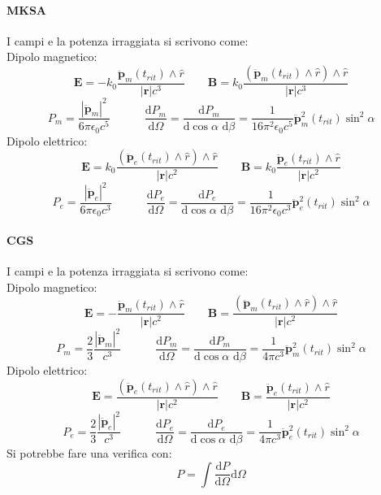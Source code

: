 \paragraph*{MKSA} I campi e la potenza irraggiata si scrivono come:\\
Dipolo magnetico:
\[
	\boldsymbol{E} = -k_{0}\frac{\ddot{\boldsymbol{p}}_m\left( t_{rit} \right) \wedge \hat{r} }{\left| \boldsymbol{r} \right| c^3} \quad \quad 
	\boldsymbol{B} = k_{0}\frac{\left( \ddot{\boldsymbol{p}}_{m}\left( t_{rit} \right) \wedge \hat{r}  \right) \wedge \hat{r}  }{ \left| \boldsymbol{r}  \right| c^3 }
\] 
\[
	P_m = \frac{\left| \ddot{\boldsymbol{p} }_{m} \right|^2}{6 \pi \epsilon_0 c^5} \quad  \quad \quad 
	\frac{\mbox{d} P_{m} }{\mbox{d} \Omega} = \frac{\mbox{d} P_m}{\mbox{d} \cos{\alpha \mbox{ d}\beta}} = \frac{1}{16 \pi ^2 \epsilon_0 c^5} \ddot{\boldsymbol{p}}_m^2( t_{rit})  \sin^2{\alpha} 
\] 
Dipolo elettrico:
\[	
	\boldsymbol{E} = k_{0}\frac{\left( \ddot{\boldsymbol{p}}_{e}\left( t_{rit} \right) \wedge \hat{r}  \right) \wedge \hat{r}  }{ \left| \boldsymbol{r}  \right| c^2 } \quad \quad 
	\boldsymbol{B} = k_{0}\frac{\ddot{\boldsymbol{p}}_e\left( t_{rit} \right) \wedge \hat{r} }{\left| \boldsymbol{r} \right| c^2} 
\] 
\[
	P_e = \frac{\left| \ddot{\boldsymbol{p} }_{e} \right|^2}{6 \pi \epsilon_0 c^3} \quad  \quad \quad 
	\frac{\mbox{d} P_{e}}{\mbox{d} \Omega} = \frac{\mbox{d} P_e}{\mbox{d} \cos{\alpha \mbox{ d}\beta}} = \frac{1}{16 \pi ^2 \epsilon_0 c^3} \ddot{\boldsymbol{p}}_e^2( t_{rit})  \sin^2{\alpha} 
\] 
\paragraph*{CGS} I campi e la potenza irraggiata si scrivono come:\\
Dipolo magnetico:
\[
	\boldsymbol{E} = -\frac{\ddot{\boldsymbol{p}}_m\left( t_{rit} \right) \wedge \hat{r} }{\left| \boldsymbol{r} \right| c^2} \quad \quad 
	\boldsymbol{B} = \frac{\left( \ddot{\boldsymbol{p}}_{m}\left( t_{rit} \right) \wedge \hat{r}  \right) \wedge \hat{r}  }{ \left| \boldsymbol{r}  \right| c^2 }
\] 
\[
	P_m = \frac{2}{3}\frac{\left| \ddot{\boldsymbol{p} }_{m} \right|^2}{c^3} \quad \quad \quad 
	\frac{\mbox{d} P_{m} }{\mbox{d} \Omega} = \frac{\mbox{d} P _m}{\mbox{d} \cos{\alpha \mbox{ d}\beta}} = \frac{1}{4 \pi c^3} \ddot{\boldsymbol{p}}_m^2( t_{rit})  \sin^2{\alpha} 
\] 
Dipolo elettrico:
\[	
	\boldsymbol{E} = \frac{\left( \ddot{\boldsymbol{p}}_{e}\left( t_{rit} \right) \wedge \hat{r}  \right) \wedge \hat{r}  }{ \left| \boldsymbol{r}  \right| c^2 } \quad \quad 
	\boldsymbol{B} = \frac{\ddot{\boldsymbol{p}}_e\left( t_{rit} \right) \wedge \hat{r} }{\left| \boldsymbol{r} \right| c^2} 
\] 
\[
	P_e = \frac{2}{3}\frac{\left| \ddot{\boldsymbol{p} }_{e} \right|^2}{c^3} \quad \quad \quad 
	\frac{\mbox{d} P_{e}}{\mbox{d} \Omega} = \frac{\mbox{d} P_e}{\mbox{d} \cos{\alpha \mbox{ d}\beta}} = \frac{1}{4 \pi c^3} \ddot{\boldsymbol{p}}_e^2( t_{rit})  \sin^2{\alpha} 
\]
Si potrebbe fare una verifica con: 
\[
	P = \int{ \frac{\mbox{d} P}{\mbox{d} \Omega}} \text{d}\Omega
\] 
